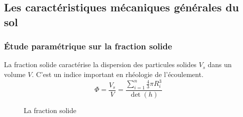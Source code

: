 \documentclass[a4paper,12pt]{report}
\begin{document}


\subsection{Les caractéristiques mécaniques générales du sol}

\subsubsection{Étude paramétrique sur la fraction solide}

La fraction solide caractérise la dispersion des particules solides $V_s$ dans un volume $V$.  
C'est un indice important en rhéologie de l'écoulement.  
\begin{equation}
\Phi = \dfrac{V_s}{V} = \dfrac{\sum\limits_{i=1}^n \frac{4}{3}\pi R_i^3}{\det(h)}
\end{equation}

\begin{figure}[h!]
    \centering
    \small
    \scalebox{0.5}{}
    \caption{La fraction solide}
    \label{fig:fractionSolideMax}
\end{figure}
\end{document}
